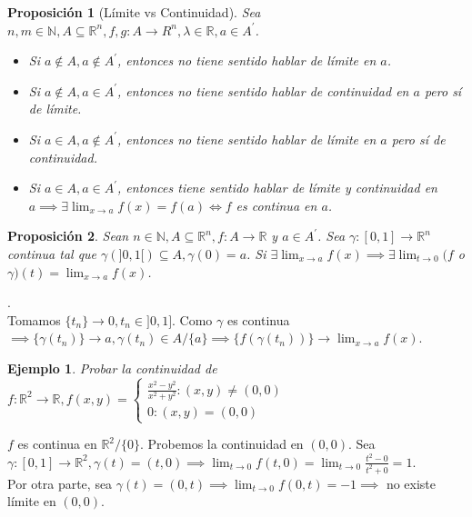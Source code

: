 \documentclass[11pt, a4paper]{article}
\makeatletter
\newif\IfInSansMode
\let\oldsf\sffamily
\renewcommand*{\sffamily}{\oldsf\mathversion{sans}\InSansModetrue}
\let\oldnorm\normalfont
\renewcommand*{\normalfont}{\oldnorm\InSansModefalse\mathversion{normal}}
\newcommand{\R}{\mathbb{R}} \newcommand{\N}{\mathbb{N}}
\renewenvironment{proof}[1][\proofname] {\par\pushQED{\qed}\normalfont\topsep6\p@\@plus6\p@\relax\trivlist\item[\hskip\labelsep\itshape\sffamily#1\@addpunct{.}]\ignorespaces}{\popQED\endtrivlist\@endpefalse}
\theoremstyle{theorem-style}
\newtheorem{nprop}{Proposición}[section]
\theoremstyle{definition-style}
\theoremstyle{remark-style}
\theoremstyle{example-style}
\newtheorem{ejemplo}{Ejemplo}[section]
\makeatother
\begin{document}
\begin{nprop}[Límite vs Continuidad]
	Sea $n,m \in \N, A \subseteq \R^n, f,g:A \to R^n, \lambda \in \R, a \in A^{'}$. 
	\begin{itemize}
		\item Si $ a \not\in A, a \not\in A^{'}$, entonces no tiene sentido hablar de límite en $a$.
		\item Si $ a \not\in A, a \in A^{'}$, entonces no tiene sentido hablar de continuidad en $a$ pero sí de límite.
		\item Si $ a \in A, a \not\in A^{'}$, entonces no tiene sentido hablar de límite en $a$ pero sí de continuidad.
		\item Si $ a \in A, a \in A^{'}$, entonces tiene sentido hablar de límite y continuidad en $a \implies \exists \lim_{x \to a} f(x)=f(a) \Leftrightarrow f$ es continua en $a$.
	\end{itemize}
\end{nprop}

\begin{nprop}
	Sean $n \in \N, A \subseteq \R^n, f:A \to \R$ y $a \in A^{'}$. Sea $ \gamma:[0,1] \to \R^n$ continua tal que $ \gamma(]0,1[) \subseteq A, \gamma(0)=a$. Si $ \exists \lim_{x \to a}f(x) \implies \exists \lim_{t \to 0}(f$ o $\gamma)(t) = \lim_{x \to a}f(x)$.	
\end{nprop}

\begin{proof}.
\\ Tomamos $\{t_n\} \to 0, t_n \in ]0,1]$. Como $ \gamma$ es continua $ \implies \{\gamma(t_n)\} \to a, \gamma(t_n) \in A/\{a\} \implies \{f(\gamma(t_n))\} \to \lim_{x \to a}f(x)$.
\end{proof}

\begin{ejemplo}
Probar la continuidad de $ f: \R^2 \to \R, f(x,y) = \left\lbrace
\begin{array}{ll}
\frac{x^2-y^2}{x^2+y^2} : (x,y) \ne (0,0)\\
0: (x,y) = (0,0)
\end{array}
\right.$
\end{ejemplo}

\begin{proof}
$f$ es continua en $\R^2/\{0\}$. Probemos la continuidad en $(0,0)$. Sea $ \gamma:[0,1] \to \R^2, \gamma(t) = (t,0) \implies \lim_{t \to 0} f(t,0) = \lim_{t \to 0}\frac{t^2-0}{t^2+0}=1$. \\
Por otra parte, sea $\gamma(t) = (0,t) \implies \lim_{t \to 0} f(0,t)=-1 \implies$ no existe límite en $(0,0)$.
\end{proof}
\end{document}
